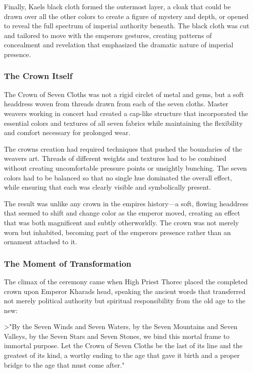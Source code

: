 Finally, Kael\textquotesingle s black cloth formed the outermost layer,
a cloak that could be drawn over all the other colors to create a figure
of mystery and depth, or opened to reveal the full spectrum of imperial
authority beneath. The black cloth was cut and tailored to move with the
emperor\textquotesingle s gestures, creating patterns of concealment and
revelation that emphasized the dramatic nature of imperial presence.

\subsubsection{The Crown Itself}\label{the-crown-itself}

The Crown of Seven Cloths was not a rigid circlet of metal and gems, but
a soft headdress woven from threads drawn from each of the seven cloths.
Master weavers working in concert had created a cap-like structure that
incorporated the essential colors and textures of all seven fabrics
while maintaining the flexibility and comfort necessary for prolonged
wear.

The crown\textquotesingle s creation had required techniques that pushed
the boundaries of the weavers\textquotesingle{} art. Threads of
different weights and textures had to be combined without creating
uncomfortable pressure points or unsightly bunching. The seven colors
had to be balanced so that no single hue dominated the overall effect,
while ensuring that each was clearly visible and symbolically present.

The result was unlike any crown in the empire\textquotesingle s
history---a soft, flowing headdress that seemed to shift and change
color as the emperor moved, creating an effect that was both magnificent
and subtly otherworldly. The crown was not merely worn but inhabited,
becoming part of the emperor\textquotesingle s presence rather than an
ornament attached to it.

\subsubsection{The Moment of
Transformation}\label{the-moment-of-transformation}

The climax of the ceremony came when High Priest Thorec placed the
completed crown upon Emperor Kharad\textquotesingle s head, speaking the
ancient words that transferred not merely political authority but
spiritual responsibility from the old age to the new:

\textgreater"By the Seven Winds and Seven Waters, by the Seven Mountains
and Seven Valleys, by the Seven Stars and Seven Stones, we bind this
mortal frame to immortal purpose. Let the Crown of Seven Cloths be the
last of its line and the greatest of its kind, a worthy ending to the
age that gave it birth and a proper bridge to the age that must come
after."

